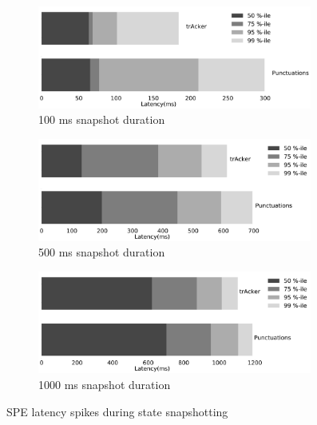 \begin{figure}[t!]
    \begin{subfigure}[b]{0.3\textwidth}
            \includegraphics[width=0.99\textwidth]{pics/buffering_latencies_barh_100.png}
            \caption{100 ms snapshot duration}
            \label{100ms_snapshot}
    \end{subfigure}
    \hspace{5mm}
    \begin{subfigure}[b]{0.3\textwidth}
            \includegraphics[width=0.99\textwidth]{pics/buffering_latencies_barh_500.png}
            \caption{500 ms snapshot duration}
            \label{500ms_snapshot}
    \end{subfigure}
    \hspace{5mm}
    \begin{subfigure}[b]{0.3\textwidth}
            \includegraphics[width=0.99\textwidth]{pics/buffering_latencies_barh_1000.png}
            \caption{1000 ms snapshot duration}
            \label{1000ms_snapshot}
    \end{subfigure}
    \caption{SPE latency spikes during state snapshotting}
    \label{snapshot_spikes}
\end{figure}

